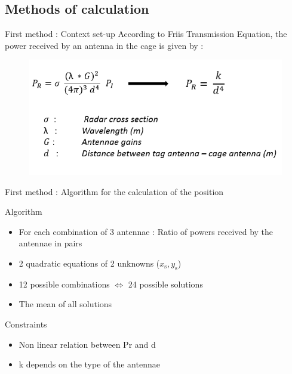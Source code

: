 \documentclass[utf8,compress]{beamer}
\begin{document}


\subsection{Methods of calculation}
\begin{frame}{First method : Context set-up }
According to Friis Transmission Equation, the power received by an antenna in the cage is given by :
    \begin{figure}[h]
        \includegraphics[width=\textwidth]{power.png}
    \end{figure}
\end{frame}


\begin{frame}[containsverbatim]{First method : Algorithm for the calculation of the position}
\begin{block}{Algorithm }
 \begin{itemize}
    \item  For each combination of 3 antennae : Ratio of powers received by the antennae in pairs
\vspace{0.4em} 
    \item 2  quadratic equations of 2 unknowns ($x_\text{s},y_\text{s}$)

    \item  12 possible combinations $\Leftrightarrow$ 24 possible solutions
\vspace{0.4em} 
    \item The mean of all solutions 
    \end{itemize}   
\end{block}

\begin{alertblock}{Constraints}
\begin{itemize}
    \item Non linear relation between Pr and d 
    \item k depends on the type of the antennae
\end{itemize}
\end{alertblock}

\end{frame}
\end{document}
